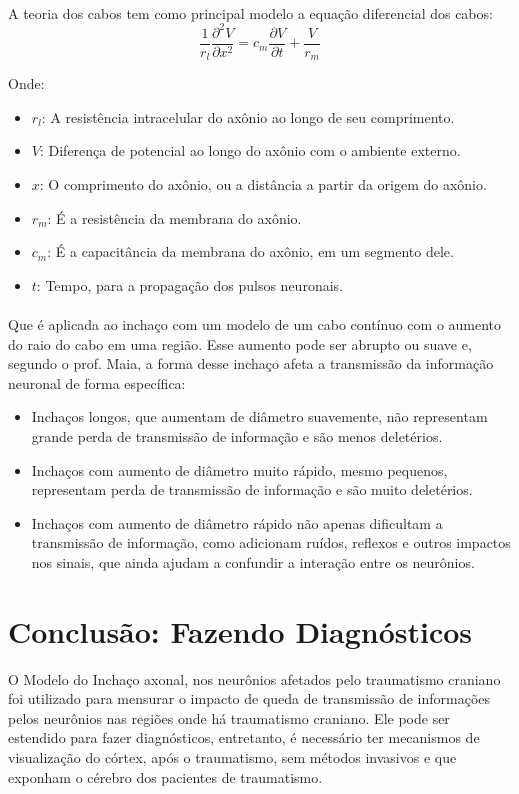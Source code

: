 \documentclass{article}
\begin{document}
	\paragraph{}
	
	A teoria dos cabos tem como principal modelo a equação diferencial dos cabos:
	\begin{equation}
		\frac{1}{r_{l}} \frac{\partial^{2} V}{\partial x^{2}} = c_{m} \frac{\partial V}{\partial t} + \frac{V}{r_m}
	\end{equation}
	
	Onde:
	\begin{itemize}
		\item $r_{l}$: A resistência intracelular do axônio ao longo de seu comprimento.
		\item $V$: Diferença de potencial ao longo do axônio com o ambiente externo.
		\item $x$: O comprimento do axônio, ou a distância a partir da origem do axônio.
		\item $r_{m}$: É a resistência da membrana do axônio.
		\item $c_{m}$: É a capacitância da membrana do axônio, em um segmento dele.
		\item $t$: Tempo, para a propagação dos pulsos neuronais.
	\end{itemize}
	
	\paragraph{}
	Que é aplicada ao inchaço com um modelo de um cabo contínuo com o aumento do raio do cabo em uma região. Esse aumento pode ser abrupto ou suave e, segundo o prof. Maia, a forma desse inchaço afeta a transmissão da informação neuronal de forma específica:
	
	\begin{itemize}
		\item Inchaços longos, que aumentam de diâmetro suavemente, não representam grande perda de transmissão de informação e são menos deletérios.
		\item Inchaços com aumento de diâmetro muito rápido, mesmo pequenos, representam perda de transmissão de informação e são muito deletérios.
		\item Inchaços com aumento de diâmetro rápido não apenas dificultam a transmissão de informação, como adicionam ruídos, reflexos e outros impactos nos sinais, que ainda ajudam a confundir a interação entre os neurônios.
	\end{itemize}
	
	\section{Conclusão: Fazendo Diagnósticos}
	O Modelo do Inchaço axonal, nos neurônios afetados pelo traumatismo craniano foi utilizado para mensurar o impacto de queda de transmissão de informações pelos neurônios nas regiões onde há traumatismo craniano. Ele pode ser estendido para fazer diagnósticos, entretanto, é necessário ter mecanismos de visualização do córtex, após o traumatismo, sem métodos invasivos e que exponham o cérebro dos pacientes de traumatismo.
\end{document}
